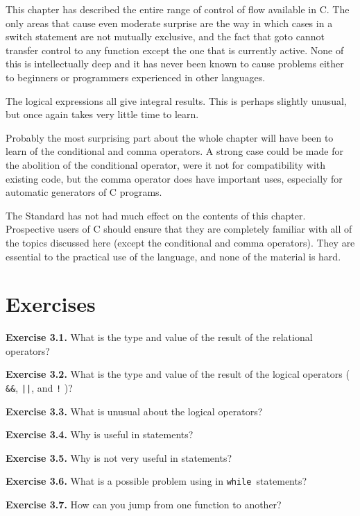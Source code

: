   This chapter has described the entire range of control of flow available
   in C. The only areas that cause even moderate surprise are the way in which
   cases in a switch statement are not mutually exclusive, and the fact that
   goto cannot transfer control to any function except the one that is
   currently active. None of this is intellectually deep and it has never been
   known to cause problems either to beginners or programmers experienced in
   other languages.


  The logical expressions all give integral results. This is perhaps
   slightly unusual, but once again takes very little time to learn.


  Probably the most surprising part about the whole chapter will have been
   to learn of the conditional and comma operators. A strong case could be
   made for the abolition of the conditional operator, were it not for
   compatibility with existing code, but the comma operator does have
   important uses, especially for automatic generators of C programs.


  The Standard has not had much effect on the contents of this chapter.
   Prospective users of C should ensure that they are completely familiar with
   all of the topics discussed here (except the conditional and comma
   operators). They are essential to the practical use of the language, and
   none of the material is hard.


 
        \section{Exercises}
        

  \textbf{Exercise 3.1.} What is the type and value of the result of the
   relational operators?


  \textbf{Exercise 3.2.} What is the type and value of the result of the logical
   operators ( \texttt{\&\&}, \texttt{||}, and
   \texttt{!} )?


  \textbf{Exercise 3.3.} What is unusual about the logical operators?


  \textbf{Exercise 3.4.} Why is \kbreak{} useful in \switch{}
   statements?


  \textbf{Exercise 3.5.} Why is \continue{} not very useful in
   \switch{} statements?


  \textbf{Exercise 3.6.} What is a possible problem using \continue{}
   in \texttt{while }statements?


  \textbf{Exercise 3.7.} How can you jump from one function to
   another?


